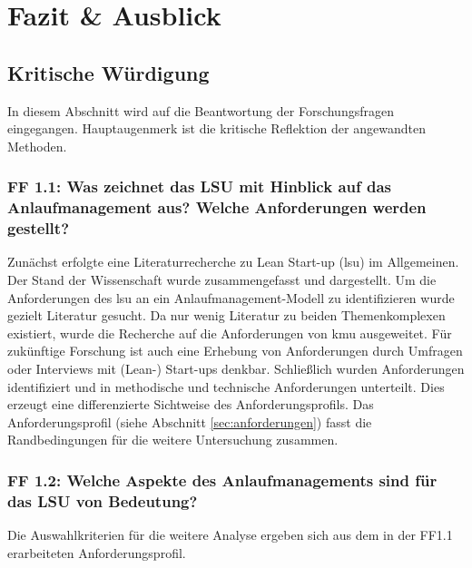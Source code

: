 \chapter{Fazit \& Ausblick}\label{sec:fazit}

\section{Kritische Würdigung}

In diesem Abschnitt wird auf die Beantwortung der Forschungsfragen eingegangen. Hauptaugenmerk ist die kritische Reflektion der angewandten Methoden. 

\subsection*{FF 1.1: Was zeichnet das LSU mit Hinblick auf das Anlaufmanagement aus? Welche Anforderungen werden gestellt?}
Zunächst erfolgte eine Literaturrecherche zu Lean Start-up (\gls{lsu}) im Allgemeinen. Der Stand der Wissenschaft wurde zusammengefasst und dargestellt. Um die Anforderungen des \gls{lsu} an ein Anlaufmanagement-Modell zu identifizieren wurde gezielt Literatur gesucht. Da nur wenig Literatur zu beiden Themenkomplexen existiert, wurde die Recherche auf die Anforderungen von \gls{kmu} ausgeweitet. Für zukünftige Forschung ist auch eine Erhebung von Anforderungen durch Umfragen oder Interviews mit (Lean-) Start-ups denkbar. Schließlich wurden Anforderungen identifiziert und in methodische und technische Anforderungen unterteilt. Dies erzeugt eine differenzierte Sichtweise des Anforderungsprofils. Das Anforderungsprofil (siehe Abschnitt \ref{sec:anforderungen}) fasst die Randbedingungen für die weitere Untersuchung zusammen. 

\subsection*{FF 1.2: Welche Aspekte des Anlaufmanagements sind für das LSU von Bedeutung?}
Die Auswahlkriterien für die weitere Analyse ergeben sich aus dem in der FF1.1 erarbeiteten Anforderungsprofil. 

